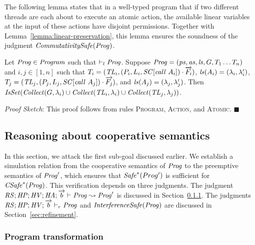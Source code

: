 The following lemma states that in a well-typed program that if two different threads 
are each about to execute an atomic action,
the available linear variables at the input of these actions have disjoint permissions.
Together with Lemma~\ref{lemma:linear-preservation}, this lemma ensures the soundness of the judgment $\mathit{CommutativitySafe}(\mathit{Prog})$.
\begin{lemma}
\label{lemma:linear-commutativity}
Let $\mathit{Prog} \in \mathit{Program}$ such that $\vdash_l \mathit{Prog}$.
Suppose $\mathit{Prog} = (\mathit{ps}, \mathit{as}, \mathit{ls}, G, T_1 \ldots T_n)$
and $i,j \in [1,n]$ such that 
$T_i = (\mathit{TL}_i,(P_i,L_i,\mathit{SC}[\mathit{call}\ A_i])\cdot\overrightarrow{F_i})$, $\mathit{ls}(A_i) = (\lambda_i,\lambda'_i)$,
$T_j = (\mathit{TL}_j,(P_j,L_j,\mathit{SC}[\mathit{call}\ A_j])\cdot\overrightarrow{F_j})$, and $\mathit{ls}(A_j) = (\lambda_j,\lambda'_j)$.
Then $\mathit{IsSet}(\mathit{Collect}(G, \lambda_i) \cup \mathit{Collect}(\mathit{TL}_i, \lambda_i) \cup \mathit{Collect}(\mathit{TL}_j, \lambda_j))$.
\end{lemma}
{\em Proof Sketch}:
This proof follows from rules \textsc{Program}, \textsc{Action}, and \textsc{Atomic}. 
$\blacksquare$


\subsection{Reasoning about cooperative semantics}
In this section, we attack the first sub-goal discussed earlier.
We establish a simulation relation from the cooperative semantics of $\mathit{Prog}$ 
to the preemptive semantics of $\mathit{Prog}'$, which ensures that $\mathit{Safe}^*(Prog')$ is sufficient for $\mathit{CSafe}^*(\mathit{Prog})$.
This verification depends on three judgments.
The judgment $\mathit{RS};\mathit{HP};\mathit{HV};\mathit{HA};\overrightarrow{b} \vdash \mathit{Prog} \leadsto \mathit{Prog}'$ is discussed in 
Section~\ref{sec:program-transformation}.
The judgments $\mathit{RS};\mathit{HP};\mathit{HV};\overrightarrow{b} \vdash_r \mathit{Prog}$ and $\mathit{InterferenceSafe}(\mathit{Prog})$
are discussed in Section~\ref{sec:refinement}.

\subsubsection{Program transformation}
\label{sec:program-transformation}

